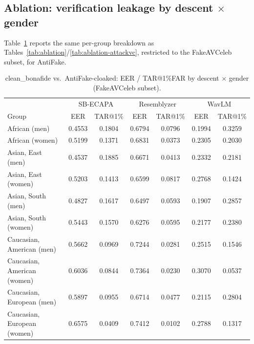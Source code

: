 \documentclass[11pt]{article}
\begin{document}
\subsection{Ablation: verification leakage by descent $\times$ gender}
\label{sec:ablation-antifake}
Table~\ref{tab:ablation-antifake} reports the same per-group breakdown
as Tables~\ref{tab:ablation}/\ref{tab:ablation-attackvc}, restricted to
the FakeAVCeleb subset, for AntiFake.

\begin{table}[H]
\centering
\caption{clean\_bonafide vs.\ AntiFake-cloaked: EER / TAR@1\%FAR by
descent $\times$ gender (FakeAVCeleb subset).}
\label{tab:ablation-antifake}
\begin{tabular}{lcccccc}
\toprule
& \multicolumn{2}{c}{SB-ECAPA} & \multicolumn{2}{c}{Resemblyzer} & \multicolumn{2}{c}{WavLM} \\
Group & EER & TAR@1\% & EER & TAR@1\% & EER & TAR@1\% \\
\midrule
African (men)               & 0.4553 & 0.1804 & 0.6794 & 0.0796 & 0.1994 & 0.3259 \\
African (women)             & 0.5199 & 0.1371 & 0.6831 & 0.0373 & 0.2305 & 0.2030 \\
Asian, East (men)           & 0.4537 & 0.1885 & 0.6671 & 0.0413 & 0.2332 & 0.2181 \\
Asian, East (women)         & 0.5203 & 0.1413 & 0.6599 & 0.0817 & 0.2768 & 0.1424 \\
Asian, South (men)          & 0.4827 & 0.1617 & 0.6497 & 0.0593 & 0.1907 & 0.2857 \\
Asian, South (women)        & 0.5443 & 0.1570 & 0.6276 & 0.0595 & 0.2177 & 0.2380 \\
Caucasian, American (men)   & 0.5662 & 0.0969 & 0.7244 & 0.0281 & 0.2515 & 0.1546 \\
Caucasian, American (women) & 0.6036 & 0.0844 & 0.7364 & 0.0230 & 0.3070 & 0.0537 \\
Caucasian, European (men)   & 0.5897 & 0.0955 & 0.6714 & 0.0477 & 0.2115 & 0.2804 \\
Caucasian, European (women) & 0.6575 & 0.0409 & 0.7412 & 0.0102 & 0.2788 & 0.1317 \\
\bottomrule
\end{tabular}
\end{table}
\end{document}
